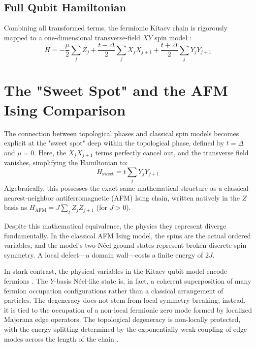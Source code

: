 \documentclass[11pt,a4paper]{article}
\begin{document}
\subsection{Full Qubit Hamiltonian}
Combining all transformed terms, the fermionic Kitaev chain is rigorously mapped to a one-dimensional transverse-field $XY$ spin model \cite{JordanWigner1928, Kitaev2001}:
\begin{equation}
    H = -\frac{\mu}{2} \sum_{j} Z_j + \frac{t-\Delta}{2} \sum_{j} X_j X_{j+1} + \frac{t+\Delta}{2} \sum_{j} Y_j Y_{j+1}
\end{equation}

\section{The "Sweet Spot" and the AFM Ising Comparison}

The connection between topological phases and classical spin models becomes explicit at the "sweet spot" deep within the topological phase, defined by $t = \Delta$ and $\mu = 0$. Here, the $X_j X_{j+1}$ terms perfectly cancel out, and the transverse field vanishes, simplifying the Hamiltonian to:
\begin{equation}
    H_{\text{sweet}} = t \sum_{j} Y_j Y_{j+1}
\end{equation}
Algebraically, this possesses the exact same mathematical structure as a classical nearest-neighbor antiferromagnetic (AFM) Ising chain, written natively in the $Z$ basis as $H_{\text{AFM}} = J \sum_j Z_j Z_{j+1}$ (for $J > 0$). 

Despite this mathematical equivalence, the physics they represent diverge fundamentally. In the classical AFM Ising model, the spins are the actual ordered variables, and the model's two N\'eel ground states represent broken discrete spin symmetry. A local defect—a domain wall—costs a finite energy of $2J$.

In stark contrast, the physical variables in the Kitaev qubit model encode fermions \cite{Kitaev2001}. The $Y$-basis N\'eel-like state is, in fact, a coherent superposition of many fermion occupation configurations rather than a classical arrangement of particles. The degeneracy does not stem from local symmetry breaking; instead, it is tied to the occupation of a non-local fermionic zero mode formed by localized Majorana edge operators. The topological degeneracy is non-locally protected, with the energy splitting determined by the exponentially weak coupling of edge modes across the length of the chain \cite{Kitaev2001}.
\end{document}
